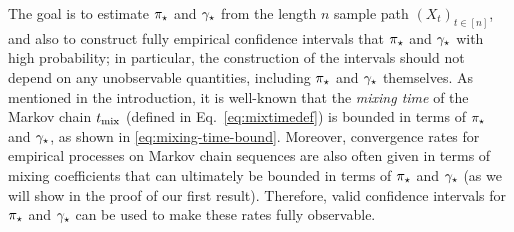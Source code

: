 The goal is to estimate $\pi_{\star}$ and $\gamma_{\star}$ from the length $n$ sample
path $(X_t)_{t \in [n]}$, and also to construct fully empirical
confidence intervals that $\pi_{\star}$ and $\gamma_{\star}$ with high probability;
in particular, the construction of the intervals should not depend on
any unobservable quantities, including $\pi_{\star}$ and $\gamma_{\star}$ themselves.
As mentioned in the introduction,
it is well-known that the \emph{mixing time} of the Markov chain
$t_{\operatorname{mix}}$ (defined in Eq.~\ref{eq:mixtimedef})
is bounded in terms of $\pi_{\star}$ and $\gamma_{\star}$, as shown in
\cref{eq:mixing-time-bound}.
%
Moreover, convergence rates for empirical processes on Markov chain
sequences are also often given in terms of mixing coefficients that
can ultimately be bounded in terms of $\pi_{\star}$ and
$\gamma_{\star}$ (as we will show in the proof of our first result).
Therefore, valid confidence intervals for $\pi_{\star}$ and $\gamma_{\star}$ can be
used to make these rates fully observable.

%
%

